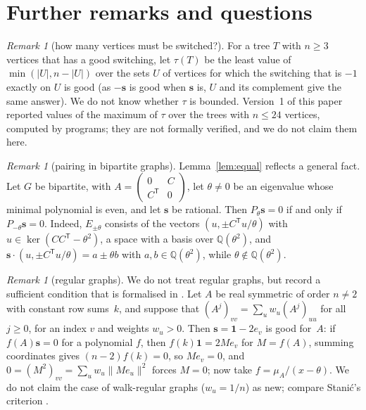 \documentclass[11pt]{article}
\numberwithin{equation}{section}
\theoremstyle{remark}
\newtheorem{remark}[lemma]{Remark}
\newcommand{\Q}{\mathbb Q}
\newcommand{\s}{\mathbf s}
\newcommand{\one}{\mathbf 1}
\begin{document}
\section{Further remarks and questions}\label{sec:rem}

\begin{remark}[how many vertices must be switched?]\label{rem:an}
For a tree $T$ with $n\ge3$ vertices that has a good switching, let $\tau(T)$
be the least value of $\min(|U|,n-|U|)$ over the sets $U$ of vertices for which
the switching that is $-1$ exactly on $U$ is good (as $-\s$ is good when $\s$
is, $U$ and its complement give the same answer). We do not know whether
$\tau$ is bounded. Version~1 of this paper reported values of the maximum of
$\tau$ over the trees with $n\le24$ vertices, computed by programs; they are
not formally verified, and we do not claim them here.
\end{remark}

\begin{remark}[pairing in bipartite graphs]\label{rem:G}
Lemma~\ref{lem:equal} reflects a general fact. Let $G$ be bipartite, with
$A=\begin{pmatrix}0&C\\C^{\mathsf T}&0\end{pmatrix}$, let $\theta\ne0$ be an
eigenvalue whose minimal polynomial is even, and let $\s$ be rational. Then
$P_\theta\s=0$ if and only if $P_{-\theta}\s=0$. Indeed, $E_{\pm\theta}$
consists of the vectors $(u,\pm C^{\mathsf T}u/\theta)$ with
$u\in\ker(CC^{\mathsf T}-\theta^2)$, a space with a basis over $\Q(\theta^2)$,
and $\s\cdot(u,\pm C^{\mathsf T}u/\theta)=a\pm\theta b$ with
$a,b\in\Q(\theta^2)$, while $\theta\notin\Q(\theta^2)$.
\end{remark}

\begin{remark}[regular graphs]\label{rem:regular}
We do not treat regular graphs, but record a sufficient condition that is
formalised in . Let $A$ be real symmetric of
order $n\ne2$ with constant row sums~$k$, and suppose that
$(A^j)_{vv}=\sum_uw_u(A^j)_{uu}$ for all $j\ge0$, for an index $v$ and weights
$w_u>0$. Then $\s=\one-2e_v$ is good for~$A$: if $f(A)\s=0$ for a polynomial $f$,
then $f(k)\one=2Me_v$ for $M=f(A)$, summing coordinates gives $(n-2)f(k)=0$, so
$Me_v=0$, and $0=(M^2)_{vv}=\sum_uw_u\|Me_u\|^2$ forces $M=0$; now take
$f=\mu_A/(x-\theta)$. We do not claim the case of walk-regular graphs
($w_u=1/n$) as new; compare Stani\'c's criterion \cite[Corollary~4.6]{sta}.
\end{remark}
\end{document}
